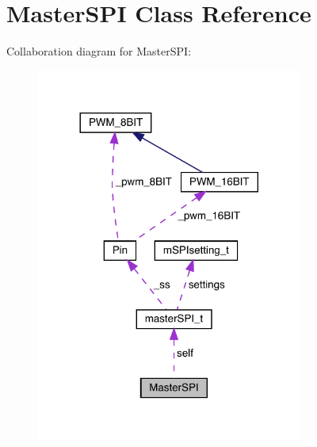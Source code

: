 \hypertarget{classMasterSPI}{}\section{Master\+S\+PI Class Reference}
\label{classMasterSPI}


Collaboration diagram for Master\+S\+PI\+:\nopagebreak
\begin{figure}[H]
\begin{center}
\leavevmode
\includegraphics[width=248pt]{classMasterSPI__coll__graph}
\end{center}
\end{figure}

